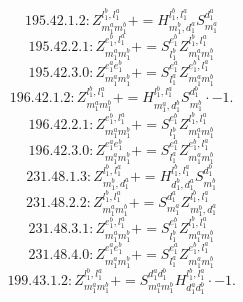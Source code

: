 \documentclass[letterpaper,10pt,fleqn,leqno,onecolumn]{article}
\begin{document}
\begin{equation} \;\;\;\;\;\;  195.42.1.2: Z^{l_{1}^{b},l_{1}^{a}}_{m_{1}^{a}m_{1}^{b}}+=H^{l_{1}^{b},l_{1}^{a}}_{m_{1}^{b},d_{1}^{a}}S^{d_{1}^{a}}_{m_{1}^{a}} \end{equation}
\begin{equation} \;\;\;\;\;\;  195.42.2.1: Z^{e_{1}^{b},l_{1}^{a}}_{m_{1}^{a}m_{1}^{b}}+=S^{e_{1}^{b}}_{l_{1}^{b}}Z^{l_{1}^{b},l_{1}^{a}}_{m_{1}^{a}m_{1}^{b}} \end{equation}
\begin{equation} \;\;\;\;\;\;  195.42.3.0: Z^{e_{1}^{a}e_{1}^{b}}_{m_{1}^{a}m_{1}^{b}}+=S^{e_{1}^{a}}_{l_{1}^{a}}Z^{e_{1}^{b},l_{1}^{a}}_{m_{1}^{a}m_{1}^{b}} \end{equation}
\begin{equation} \;\;\;\;\;\;  196.42.1.2: Z^{l_{1}^{b},l_{1}^{a}}_{m_{1}^{a}m_{1}^{b}}+=H^{l_{1}^{b},l_{1}^{a}}_{m_{1}^{a},d_{1}^{b}}S^{d_{1}^{b}}_{m_{1}^{b}}\cdot -1. \end{equation}
\begin{equation} \;\;\;\;\;\;  196.42.2.1: Z^{e_{1}^{b},l_{1}^{a}}_{m_{1}^{a}m_{1}^{b}}+=S^{e_{1}^{b}}_{l_{1}^{b}}Z^{l_{1}^{b},l_{1}^{a}}_{m_{1}^{a}m_{1}^{b}} \end{equation}
\begin{equation} \;\;\;\;\;\;  196.42.3.0: Z^{e_{1}^{a}e_{1}^{b}}_{m_{1}^{a}m_{1}^{b}}+=S^{e_{1}^{a}}_{l_{1}^{a}}Z^{e_{1}^{b},l_{1}^{a}}_{m_{1}^{a}m_{1}^{b}} \end{equation}
\begin{equation} \;\;\;\;\;\;  231.48.1.3: Z^{l_{1}^{b},l_{1}^{a}}_{m_{1}^{b},d_{1}^{a}}+=H^{l_{1}^{b},l_{1}^{a}}_{d_{1}^{b},d_{1}^{a}}S^{d_{1}^{b}}_{m_{1}^{b}} \end{equation}
\begin{equation} \;\;\;\;\;\;  231.48.2.2: Z^{l_{1}^{b},l_{1}^{a}}_{m_{1}^{a}m_{1}^{b}}+=S^{d_{1}^{a}}_{m_{1}^{a}}Z^{l_{1}^{b},l_{1}^{a}}_{m_{1}^{b},d_{1}^{a}} \end{equation}
\begin{equation} \;\;\;\;\;\;  231.48.3.1: Z^{e_{1}^{b},l_{1}^{a}}_{m_{1}^{a}m_{1}^{b}}+=S^{e_{1}^{b}}_{l_{1}^{b}}Z^{l_{1}^{b},l_{1}^{a}}_{m_{1}^{a}m_{1}^{b}} \end{equation}
\begin{equation} \;\;\;\;\;\;  231.48.4.0: Z^{e_{1}^{a}e_{1}^{b}}_{m_{1}^{a}m_{1}^{b}}+=S^{e_{1}^{a}}_{l_{1}^{a}}Z^{e_{1}^{b},l_{1}^{a}}_{m_{1}^{a}m_{1}^{b}} \end{equation}
\begin{equation} \;\;\;\;\;\;  199.43.1.2: Z^{l_{1}^{b},l_{1}^{a}}_{m_{1}^{a}m_{1}^{b}}+=S^{d_{1}^{a}d_{1}^{b}}_{m_{1}^{a}m_{1}^{b}}H^{l_{1}^{b},l_{1}^{a}}_{d_{1}^{a}d_{1}^{b}}\cdot -1. \end{equation}
\end{document}
